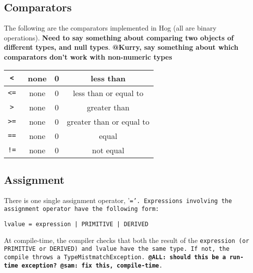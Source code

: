 \documentclass{book}
\begin{document}

\subsection{Comparators} %
\label{sub:comparators}

The following are the comparators implemented in Hog (all are binary operations).
\textbf{Need to say something about comparing two objects of different types, and
null types}. \textbf{@Kurry, say something about which comparators don't work with non-numeric types}

\begin{center}
\begin{tabular}{|c|c|c|c|}

\hline
\tt < \rm & none & 0 & less than \\ \hline
\tt <= \rm & none & 0 & less than or equal to \\ \hline
\tt > \rm & none & 0 & greater than \\ \hline
\tt >= \rm & none & 0 & greater than or equal to \\ \hline
\tt == \rm & none & 0 & equal \\ \hline
\tt != \rm & none & 0 & not equal \\ \hline

\end{tabular}
\end{center}


\subsection{Assignment} %
\label{sub:assignment}

There is one single assignment operator, '\tt =\rm'. Expressions involving the
assignment operator have the following form:

\begin{verbatim}
lvalue = expression | PRIMITIVE | DERIVED
\end{verbatim}

At compile-time, the compiler checks that both the result of the \tt expression \rm
(or \tt PRIMITIVE \rm or \tt DERIVED\rm) and \tt lvalue \rm have the same type. If
not, the compile throws a \tt TypeMistmatchException\rm. \textbf{@ALL: should this
be a run-time exception?} \textbf{@sam: fix this, compile-time}.

\end{document}
